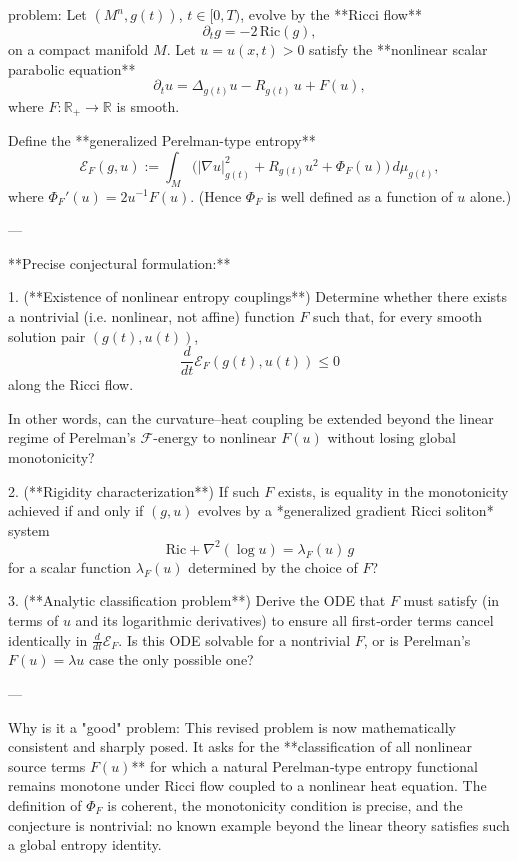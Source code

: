 problem:  
Let \((M^n,g(t))\), \(t\in[0,T)\), evolve by the **Ricci flow**
\[
\partial_t g = -2\,\mathrm{Ric}(g),
\]
on a compact manifold \(M\).  
Let \(u=u(x,t)>0\) satisfy the **nonlinear scalar parabolic equation**
\[
\partial_t u = \Delta_{g(t)} u - R_{g(t)}\,u + F(u),
\]
where \(F:\mathbb{R}_+\to\mathbb{R}\) is smooth.

Define the **generalized Perelman-type entropy**
\[
\mathcal{E}_F(g,u) := \int_M \big(|\nabla u|_{g(t)}^2 + R_{g(t)}u^2 + \Phi_F(u)\big)\,d\mu_{g(t)},
\]
where \(\Phi_F'(u)=2u^{-1}F(u)\).  (Hence \(\Phi_F\) is well defined as a function of \(u\) alone.)

---

**Precise conjectural formulation:**

1. (**Existence of nonlinear entropy couplings**)  
   Determine whether there exists a nontrivial (i.e. nonlinear, not affine) function \(F\) such that, for every smooth solution pair \((g(t),u(t))\),
   \[
   \frac{d}{dt}\mathcal{E}_F(g(t),u(t)) \le 0
   \]
   along the Ricci flow.  

   In other words, can the curvature–heat coupling be extended beyond the linear regime of Perelman’s \(\mathcal{F}\)-energy to nonlinear \(F(u)\) without losing global monotonicity?

2. (**Rigidity characterization**)  
   If such \(F\) exists, is equality in the monotonicity achieved if and only if \((g,u)\) evolves by a *generalized gradient Ricci soliton* system
   \[
   \mathrm{Ric} + \nabla^2(\log u) = \lambda_F(u)\, g
   \]
   for a scalar function \(\lambda_F(u)\) determined by the choice of \(F\)?

3. (**Analytic classification problem**)  
   Derive the ODE that \(F\) must satisfy (in terms of \(u\) and its logarithmic derivatives) to ensure all first‑order terms cancel identically in \(\tfrac{d}{dt}\mathcal{E}_F\).  Is this ODE solvable for a nontrivial \(F\), or is Perelman’s \(F(u)=\lambda u\) case the only possible one?

---

Why is it a "good" problem:  
This revised problem is now mathematically consistent and sharply posed.  It asks for the **classification of all nonlinear source terms \(F(u)\)** for which a natural Perelman‑type entropy functional remains monotone under Ricci flow coupled to a nonlinear heat equation.  The definition of \(\Phi_F\) is coherent, the monotonicity condition is precise, and the conjecture is nontrivial: no known example beyond the linear theory satisfies such a global entropy identity.  

